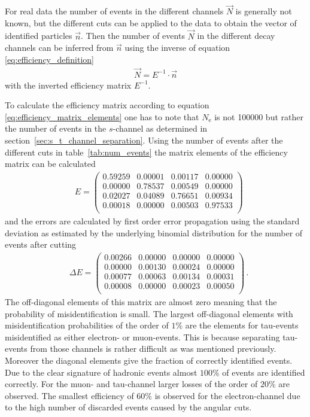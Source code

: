 \documentclass[11pt, a4paper]{article}
\numberwithin{equation}{section}
\begin{document}
For real data the number of events in the different channels $\vec{N}$ is generally not known, but the different cuts can be applied to the data to obtain the vector of identified particles $\vec{n}$.
Then the number of events $\vec{N}$ in the different decay channels can be inferred from $\vec{n}$ using the inverse of equation \eqref{eq:efficiency_definition}
\begin{align}
	\vec{N} = E^{-1} \cdot \vec{n}
	\label{eq:efficiency_correction}
\end{align}
with the inverted efficiency matrix $E^{-1}$.

To calculate the efficiency matrix according to equation \eqref{eq:efficiency_matrix_elements} one has to note that $N_\mathrm{e}$ is not \num{100000} but rather the number of events in the $s$-channel as determined in section~\ref{sec:s_t_channel_separation}.
Using the number of events after the different cuts in table~\ref{tab:num_events} the matrix elements of the efficiency matrix can be calculated
\begin{align*}
	&E = \begin{pmatrix}
	0.59259 & 0.00001 & 0.00117 & 0.00000 \\
	0.00000 & 0.78537 & 0.00549 & 0.00000 \\
	0.02027 & 0.04089 & 0.76651 & 0.00934 \\
	0.00018 & 0.00000 & 0.00503 & 0.97533 \\
	\end{pmatrix}
\end{align*}
and the errors are calculated by first order error propagation using the standard deviation as estimated by the underlying binomial distribution for the number of events after cutting
\begin{align*}
	&\Delta E = \begin{pmatrix}
	0.00266 & 0.00000 & 0.00000 & 0.00000 \\
	0.00000 & 0.00130 & 0.00024 & 0.00000 \\
	0.00077 & 0.00063 & 0.00134 & 0.00031 \\
	0.00008 & 0.00000 & 0.00023 & 0.00050 \\
	\end{pmatrix} \,\text{.}
\end{align*}
The off-diagonal elements of this matrix are almost zero meaning that the probability of misidentification is small.
The largest off-diagonal elements with misidentification probabilities of the order of $1 \%$ are the elements for tau-events misidentified as either electron- or muon-events.
This is because separating tau-events from those channels is rather difficult as was mentioned previously.
Moreover the diagonal elements give the fraction of correctly identified events.
Due to the clear signature of hadronic events almost $100 \%$ of events are identified correctly.
For the muon- and tau-channel larger losses of the order of $20 \%$ are observed.
The smallest efficiency of $60 \%$ is observed for the electron-channel due to the high number of discarded events caused by the angular cuts.
\end{document}
